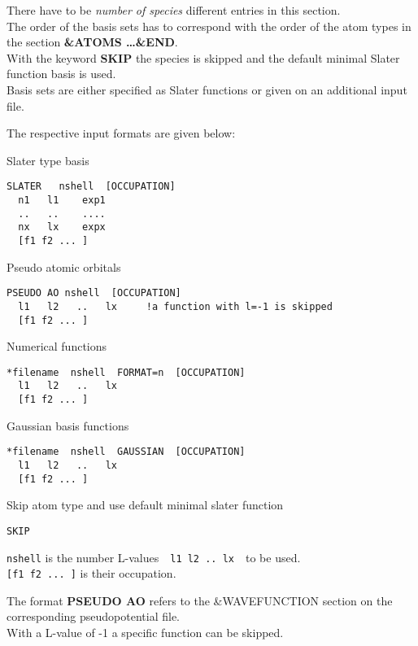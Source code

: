 \documentclass[twoside,10pt,titlepage,a4paper]{article}
\begin{document}
There have to be {\em number of species} different entries in this
section. \\

The order of the basis sets has to correspond with the order
of the atom types in the section {\bf \&ATOMS \ldots \&END}.\\
With the keyword {\bf SKIP} the species is skipped and the
default minimal Slater function basis is used.\\
Basis sets are either specified as Slater functions or given
on an additional input file.

\medskip

\noindent
The respective input formats are given below:

\medskip

\noindent
Slater type basis
\begin{verbatim}
SLATER   nshell  [OCCUPATION]
  n1   l1    exp1
  ..   ..    ....
  nx   lx    expx
  [f1 f2 ... ]
\end{verbatim}
\bigskip

\noindent
Pseudo atomic orbitals
\begin{verbatim}
PSEUDO AO nshell  [OCCUPATION]
  l1   l2   ..   lx     !a function with l=-1 is skipped
  [f1 f2 ... ]
\end{verbatim}
\bigskip

\noindent
Numerical functions
\begin{verbatim}
*filename  nshell  FORMAT=n  [OCCUPATION]
  l1   l2   ..   lx
  [f1 f2 ... ]
\end{verbatim}
\bigskip

\noindent
Gaussian basis functions
\begin{verbatim}
*filename  nshell  GAUSSIAN  [OCCUPATION]
  l1   l2   ..   lx
  [f1 f2 ... ]
\end{verbatim}
\bigskip

\noindent
Skip atom type and use default minimal slater function
\begin{verbatim}
SKIP
\end{verbatim}

\medskip

\noindent
{\tt nshell} is the number L-values\ \ {\tt l1 l2  ..  lx}\ \
to be used.\\
{\tt [f1 f2 ... ]} is their occupation.

\medskip

\noindent
The format {\bf PSEUDO AO} refers to the \&WAVEFUNCTION section
on the corresponding pseudopotential file. \\
With a L-value of -1 a specific function can be skipped.
\end{document}
